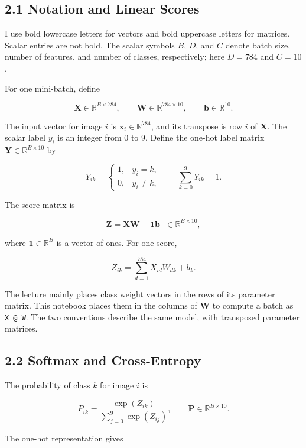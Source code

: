 \documentclass[UTF8,a4paper,12pt,fontset=fandol]{ctexart}
\begin{document}
\subsection*{2.1 Notation and Linear Scores}

I use bold lowercase letters for vectors and bold uppercase letters for matrices. Scalar entries are not bold. The scalar symbols \(B\), \(D\), and \(C\) denote batch size, number of features, and number of classes, respectively; here \(D = 784\) and \(C = 10\).

For one mini-batch, define

\[
\boldsymbol{X}\in\mathbb{R}^{B\times784},\qquad
\boldsymbol{W}\in\mathbb{R}^{784\times10},\qquad
\boldsymbol{b}\in\mathbb{R}^{10}.
\]

The input vector for image \(i\) is \(\boldsymbol{x}_i\in\mathbb{R}^{784}\), and its transpose is row \(i\) of \(\boldsymbol{X}\). The scalar label \(y_i\) is an integer from 0 to 9. Define the one-hot label matrix \(\boldsymbol{Y}\in\mathbb{R}^{B\times10}\) by

\[
Y_{ik}=\begin{cases}
1,&y_i=k,\\
0,&y_i\ne k,
\end{cases}
\qquad
\sum_{k=0}^{9}Y_{ik}=1.
\]

The score matrix is

\[
\boldsymbol{Z}=\boldsymbol{X}\boldsymbol{W}
+\boldsymbol{1}\boldsymbol{b}^{\top}
\in\mathbb{R}^{B\times10},
\]

where \(\boldsymbol{1}\in\mathbb{R}^{B}\) is a vector of ones. For one score,

\[
Z_{ik}=\sum_{d=1}^{784}X_{id}W_{dk}+b_k.
\]

The lecture mainly places class weight vectors in the rows of its parameter matrix. This notebook places them in the columns of \(\boldsymbol{W}\) to compute a batch as \texttt{X\ @\ W}. The two conventions describe the same model, with transposed parameter matrices.

\subsection*{2.2 Softmax and Cross-Entropy}

The probability of class \(k\) for image \(i\) is

\[
P_{ik}=\frac{\exp(Z_{ik})}{\sum_{j=0}^{9}\exp(Z_{ij})},
\qquad
\boldsymbol{P}\in\mathbb{R}^{B\times10}.
\]

The one-hot representation gives
\end{document}
